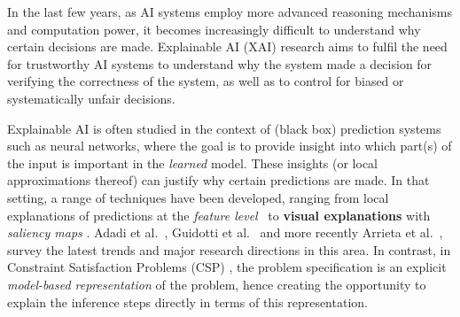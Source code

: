 

In the last few years, as AI systems employ more advanced reasoning mechanisms and computation power, it becomes increasingly difficult to understand why certain decisions are made. 
Explainable AI (XAI) research aims to fulfil the need for trustworthy AI systems to understand why the system made a decision for verifying the correctness of the system, as well as to control for biased or systematically unfair decisions.

Explainable AI is often studied in the context of (black box) prediction systems such as neural networks, where the goal is to provide insight into which part(s) of the input is important in the \textit{learned} model. 
These insights (or local approximations thereof) can justify why certain predictions are made. 
In that setting, a range of techniques have been developed, ranging from local explanations of predictions at the \textit{feature level}~\cite{ribeiro2016should,lundberg2017unified} to \textbf{visual explanations} with \textit{saliency maps} \cite{selvaraju2017grad}. %
Adadi et al.~\cite{Adadi_2018}, Guidotti et al.~\cite{guidotti2018survey} and more recently Arrieta et al.~\cite{Barredo_Arrieta_2020}, survey the latest trends and  major research directions in this area.
In contrast, in Constraint Satisfaction Problems (CSP) \cite{fai/Rossi06}, the problem specification is an explicit \textit{model-based representation} of the problem, hence creating the opportunity to explain the inference steps directly in terms of this representation.





